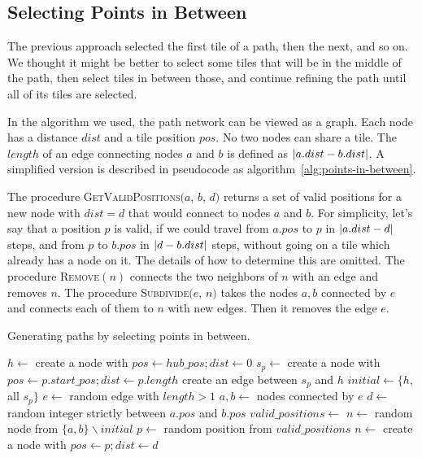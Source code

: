\subsection{Selecting Points in Between}\label{sec:analysis-points-in-between}

The previous approach selected the first tile of a path, then the next, and so on.
We thought it might be better to select some tiles that will be in the middle of the path, then select tiles in between those, and continue refining the path until all of its tiles are selected.

In the algorithm we used, the path network can be viewed as a graph.
Each node has a distance $dist$ and a tile position $pos$.
No two nodes can share a tile.
The $length$ of an edge connecting nodes $a$ and $b$ is defined as $\left|{a.dist - b.dist}\right|$.
A simplified version is described in pseudocode as algorithm~\ref{alg:points-in-between}.

The procedure \textsc{GetValidPositions}$(a$, $b$, $d)$ returns a set of valid positions for a new node with $dist = d$ that would connect to nodes $a$ and $b$.
For simplicity, let's say that a position $p$ is valid, if we could travel from $a.pos$ to $p$ in $\left|{a.dist - d}\right|$ steps, and from $p$ to $b.pos$ in $\left|{d - b.dist}\right|$ steps, without going on a tile which already has a node on it.
The details of how to determine this are omitted.
The procedure \textsc{Remove}$(n)$ connects the two neighbors of $n$ with an edge and removes $n$.
The procedure \textsc{Subdivide}$(e$, $n)$ takes the nodes $a,b$ connected by $e$ and connects each of them to $n$ with new edges.
Then it removes the edge $e$.

\begin{algorithm}[H]
    \caption{Generating paths by selecting points in between.}
    \label{alg:points-in-between}
    \begin{algorithmic}[1]
        \State $h \gets$ create a node  with $pos \gets hub\_pos; dist \gets 0$
        \State $s_p \gets$ create a node with $pos \gets p.start\_pos; dist \gets p.length$
        \State create an edge between $s_p$ and $h$
        \EndFor
        \State $initial \gets \{h,$ all $s_p\}$
        \Statex
        \State $e \gets$ random edge with $length > 1$
        \State $a, b \gets$ nodes connected by $e$
        \State $d \gets$ random integer strictly between $a.pos$ and $b.pos$
        \State $valid\_positions \gets$ 
        \Statex
        \State $n \gets$ random node from $\{a, b\} \smallsetminus initial$
        \State {}
        \EndIf
        \Else
        \State $p \gets$ random position from $valid\_positions$
        \State $n \gets$ create a node with $pos \gets p; dist \gets d$
        \State {}
        \EndIf
        \EndWhile
        \Statex
    \end{algorithmic}
\end{algorithm}

